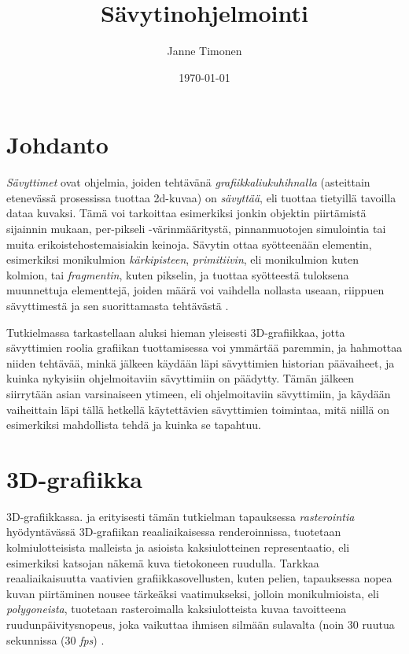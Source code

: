 \documentclass[finnish]{tktltiki2}
\title{Sävytinohjelmointi}
\author{Janne Timonen}
\date{\today}
\theoremstyle{definition}
\theoremstyle{remark}
\begin{document}

\frontmatter      %

\maketitle        %
\makeabstract     %

\tableofcontents  %


\mainmatter       %

\section{Johdanto}


\emph{Sävyttimet} ovat ohjelmia, joiden tehtävänä \emph{grafiikkaliukuhihnalla} (asteittain etenevässä prosessissa tuottaa 2d-kuvaa) on \emph{sävyttää}, eli tuottaa tietyillä tavoilla dataa kuvaksi. Tämä voi tarkoittaa esimerkiksi jonkin objektin piirtämistä sijainnin mukaan, per-pikseli -värinmääritystä, pinnanmuotojen simulointia tai muita erikoistehostemaisiakin keinoja. Sävytin ottaa syötteenään elementin, esimerkiksi monikulmion \emph{kärkipisteen}, \emph{primitiivin}, eli monikulmion kuten kolmion, tai \emph{fragmentin}, kuten pikselin, ja tuottaa syötteestä tuloksena muunnettuja elementtejä, joiden määrä voi vaihdella nollasta useaan, riippuen sävyttimestä ja sen suorittamasta tehtävästä \cite{Gre14}.

Tutkielmassa tarkastellaan aluksi hieman yleisesti 3D-grafiikkaa, jotta sävyttimien roolia grafiikan tuottamisessa voi ymmärtää paremmin, ja hahmottaa niiden tehtävää, minkä jälkeen käydään läpi sävyttimien historian päävaiheet, ja kuinka nykyisiin ohjelmoitaviin sävyttimiin on päädytty. Tämän jälkeen siirrytään asian varsinaiseen ytimeen, eli ohjelmoitaviin sävyttimiin, ja käydään vaiheittain läpi tällä hetkellä käytettävien sävyttimien toimintaa, mitä niillä on esimerkiksi mahdollista tehdä ja kuinka se tapahtuu.

\section{3D-grafiikka}

3D-grafiikkassa. ja erityisesti tämän tutkielman tapauksessa \emph{rasterointia} hyödyntävässä 3D-grafiikan reaaliaikaisessa renderoinnissa, tuotetaan kolmiulotteisista malleista ja asioista kaksiulotteinen representaatio, eli esimerkiksi katsojan näkemä kuva tietokoneen ruudulla. Tarkkaa reaaliaikaisuutta vaativien grafiikkasovellusten, kuten pelien, tapauksessa nopea kuvan piirtäminen nousee tärkeäksi vaatimukseksi, jolloin monikulmioista, eli \emph{polygoneista}, tuotetaan rasteroimalla kaksiulotteista kuvaa tavoitteena ruudunpäivitysnopeus, joka vaikuttaa ihmisen silmään sulavalta (noin 30 ruutua sekunnissa (30 \emph{fps}) \cite{Gre14}. 
\end{document}
